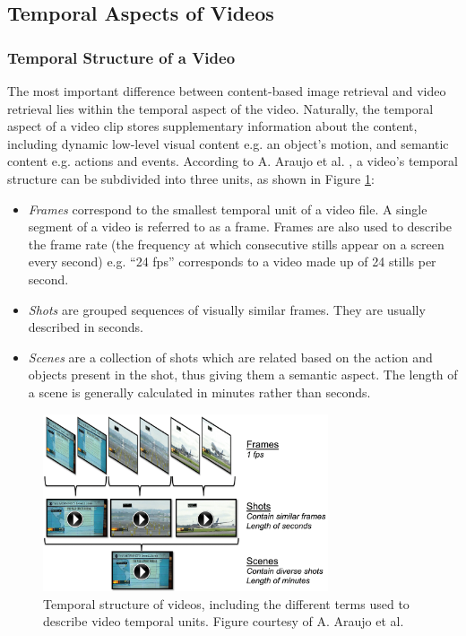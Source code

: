 
\subsection{Temporal Aspects of Videos}
\label{sec:temporal-aspect-videos}

\subsubsection{Temporal Structure of a Video}

The most important difference between content-based image retrieval and video retrieval lies within the temporal aspect of the video. Naturally, the temporal aspect of a video clip stores supplementary information about the content, including dynamic low-level visual content e.g. an object's motion, and semantic content e.g. actions and events. According to A. Araujo et al. \cite{araujo2017i2v}, a video's temporal structure can be subdivided into three units, as shown in Figure \ref{fig:temporal_structure}:
\begin{itemize}
    \item \textit{Frames} correspond to the smallest temporal unit of a video file. A single segment of a video is referred to as a frame. Frames are also used to describe the frame rate (the frequency at which consecutive stills appear on a screen every second) e.g. ``24 fps'' corresponds to a video made up of 24 stills per second.
    \item \textit{Shots} are grouped sequences of visually similar frames. They are usually described  in seconds.
    \item \textit{Scenes} are a collection of shots which are related based on the action and objects present in the shot, thus giving them a semantic aspect. The length of a scene 
    is generally calculated in minutes rather than seconds.
\end{itemize}

\begin{figure}[h]
\centerline{\includegraphics[width=0.75\textwidth]{figures/temporal_structure_videos.png}}
\caption{\label{fig:temporal_structure}Temporal structure of videos, including the different terms used to describe video temporal units. Figure courtesy of A. Araujo et al.}
\end{figure}


